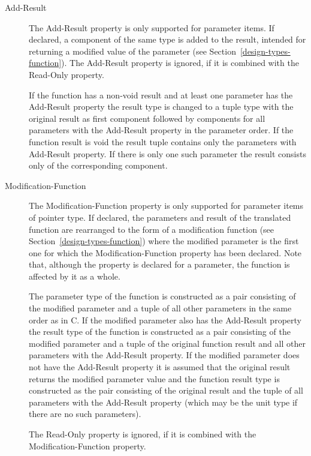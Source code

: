 \begin{description}
\item[Add-Result]

The Add-Result property is only supported for parameter items. If declared, a component of the same type
is added to the result, intended for returning a modified value of the parameter (see Section~\ref{design-types-function}). 
The Add-Result property is ignored, if it is combined with the Read-Only property.

If the function has a non-void result and at least one parameter has the Add-Result property the result type is changed
to a tuple type with the original result as first component followed by components for all parameters with the Add-Result
property in the parameter order. If the function result is void the result tuple contains only the parameters with 
Add-Result property. If there is only one such parameter the result consists only of the corresponding component.

\item[Modification-Function]

The Modification-Function property is only supported for parameter items of pointer type. If declared, the parameters and
result of the translated function are rearranged to the form of a modification function (see 
Section~\ref{design-types-function}) where the modified parameter is the first one for which the Modification-Function 
property has been declared. Note that, although the property is declared for a parameter, the function is affected
by it as a whole.

The parameter type of the function is constructed as a pair consisting of the modified parameter and a tuple of all 
other parameters in the same order as in C. If the modified parameter also has the Add-Result property the result type 
of the function is constructed as a pair consisting of the modified parameter and a tuple of the original function result
and all other parameters with the Add-Result property. If the modified parameter does not have the Add-Result property
it is assumed that the original result returns the modified parameter value and the function result type is constructed 
as the pair consisting of the original result and the tuple of all parameters with the Add-Result property (which may 
be the unit type if there are no such parameters).

The Read-Only property is ignored, if it is combined with the Modification-Function property.

\end{description}

